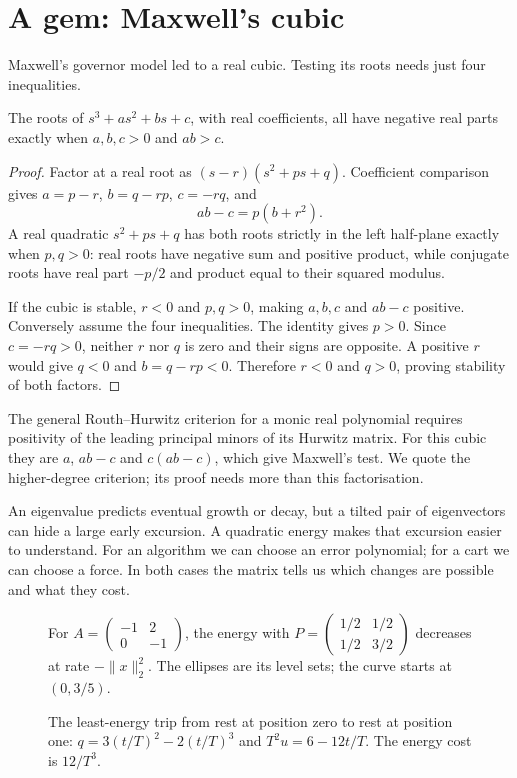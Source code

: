 \section{A gem: Maxwell's cubic}

Maxwell's governor model led to a real cubic. Testing its roots needs just four inequalities.
\begin{theorem}[Maxwell, 1868]\label{linear:thm:maxwell}
The roots of $s^3+as^2+bs+c$, with real coefficients, all have negative real parts exactly when $a,b,c>0$ and $ab>c$.
\end{theorem}
\begin{proof}
Factor at a real root as $(s-r)(s^2+ps+q)$. Coefficient comparison gives $a=p-r$, $b=q-rp$, $c=-rq$, and
\[ab-c=p(b+r^2).
\]
A real quadratic $s^2+ps+q$ has both roots strictly in the left half-plane exactly when $p,q>0$: real roots have negative sum and positive product, while conjugate roots have real part $-p/2$ and product equal to their squared modulus.

If the cubic is stable, $r<0$ and $p,q>0$, making $a,b,c$ and $ab-c$ positive. Conversely assume the four inequalities. The identity gives $p>0$. Since $c=-rq>0$, neither $r$ nor $q$ is zero and their signs are opposite. A positive $r$ would give $q<0$ and $b=q-rp<0$. Therefore $r<0$ and $q>0$, proving stability of both factors.
\end{proof}

The general Routh--Hurwitz criterion for a monic real polynomial requires positivity of the leading principal minors of its Hurwitz matrix. For this cubic they are $a$, $ab-c$ and $c(ab-c)$, which give Maxwell's test. We quote the higher-degree criterion; its proof needs more than this factorisation.

\begin{beauty}
An eigenvalue predicts eventual growth or decay, but a tilted pair of eigenvectors can hide a large early excursion. A quadratic energy makes that excursion easier to understand. For an algorithm we can choose an error polynomial; for a cart we can choose a force. In both cases the matrix tells us which changes are possible and what they cost.
\end{beauty}

\begin{figure}[ht]
\centering
{}
\caption{For $A=\left(\begin{smallmatrix}-1&2\\0&-1\end{smallmatrix}\right)$, the energy with $P=\left(\begin{smallmatrix}1/2&1/2\\1/2&3/2\end{smallmatrix}\right)$ decreases at rate $-\|x\|_2^2$. The ellipses are its level sets; the curve starts at $(0,3/5)$.}
\label{fig:v8appFenergy}
\end{figure}
\begin{figure}[ht]
\centering
{}
\caption{The least-energy trip from rest at position zero to rest at position one: $q=3(t/T)^2-2(t/T)^3$ and $T^2u=6-12t/T$. The energy cost is $12/T^3$.}
\label{fig:v8appFcart}
\end{figure}

